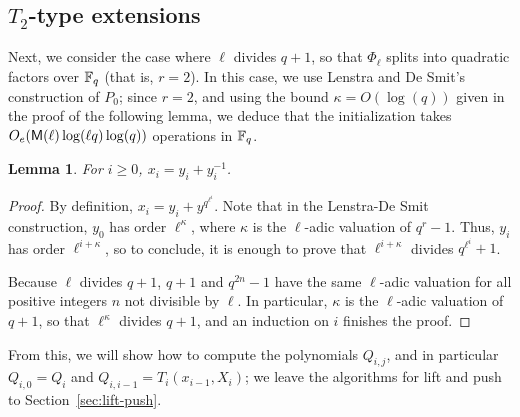 \documentclass{sig-alternate}
\newtheorem{lemma}[definition]{Lemma}
\begin{document}

\subsection{$T_2$-type extensions}
\label{ssec:T2}

Next, we consider the case where $\ell$ divides $q+1$, so that
$\Phi_\ell$ splits into quadratic factors over $\mathbb{F}_q$ (that is,
$r=2$). In this case, we use Lenstra and De Smit's construction of
$P_0$; since $r=2$, and using the bound $\kappa=O(\log(q))$ given in
the proof of the following lemma, we deduce that the initialization
takes $O_e(\mathsf{M}(\ell)\log(\ell q)\log(q))$ operations in $\mathbb{F}_q$.

\begin{lemma}
  \label{th:T2-norm}
  For $i \ge 0$, $x_i = y_i +y_i^{-1}$.
\end{lemma}
\begin{proof}
  By definition, $x_i=y_i+y^{q^{\ell^i}}$. Note that in the Lenstra-De
  Smit construction, $y_0$ has order $\ell^{\kappa}$, where $\kappa$
  is the $\ell$-adic valuation of $q^r-1$. Thus, $y_i$ has order
  $\ell^{i+\kappa}$, so to conclude, it is enough to prove that
  $\ell^{i+\kappa}$ divides $q^{\ell^i}+1$.

  Because $\ell$ divides $q+1$, $q+1$ and $q^{2n}-1$ have the same
  $\ell$-adic valuation for all positive integers $n$ not divisible by
  $\ell$. In particular, $\kappa$ is the $\ell$-adic valuation of
  $q+1$, so that $\ell^\kappa$ divides $q+1$, and an induction on $i$
  finishes the proof.
\end{proof}

From this, we will show how to compute the polynomials $Q_{i,j}$, and
in particular $Q_{i,0}=Q_i$ and $Q_{i,i-1}=T_i(x_{i-1},X_i)$; we leave
the algorithms for lift and push to Section~\ref{sec:lift-push}.
\end{document}
